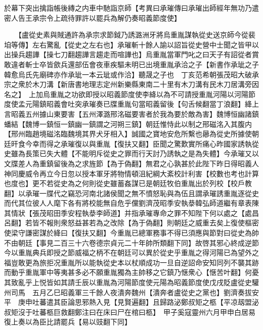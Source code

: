 於幕下突出擒詣帳後縳之内車中馳詣京師【考異曰承璀傳曰承璀出師經年無功乃遣密人告王承宗令上疏待罪許以罷兵為解仍奏昭義節度使】

　　【盧從史素與賊通許為承宗求節鉞乃誘潞洲牙將烏重胤謀執從史送京師今從裴垍等傳】左右驚亂【從史之左右也】承璀斬十餘人諭以詔旨從史營中士聞之皆甲以出操兵趨譁【操七刀翻趨譁言趨走而喧譁也】烏重胤當軍門叱之曰天子有詔從者賞敢違者斬士卒皆歛兵還部伍會夜車疾驅未明已出境重胤承洽之子【新書作承玼之子韓愈烏氏先廟碑亦作承玼一本云玼或作洽】聽晟之子也　丁亥范希朝張茂昭大破承宗之衆於木刀溝【新唐書地理志定州新樂縣東南二十里有木刀溝有民木刀居溝旁因名之】　上加烏重胤之功欲即授以昭義節度使李絳以為不可請授重胤河陽以河陽節度使孟元陽鎮昭義會吐突承璀奏已牒重胤句當昭義留後【句舌候翻當丁浪翻】絳上言昭義五州據山東要害【五州澤潞邢洺磁要害者於我為要於敵為害】魏博恒幽諸鎮蟠結【魏博一鎮恒一鎮幽一鎮謂之河朔三鎮】朝廷惟恃此以制之邢磁洺入其腹内【邢州臨趙境磁洺臨魏境其界犬牙相入】誠國之寶地安危所繫也曏為從史所據使朝廷旰食今幸而得之承璀復以與重胤【復扶又翻】臣聞之驚歎實所痛心昨國家誘執從史雖為長策已失大體【不能明斥從史之罪而行天討乃誘執之是為失體】今承璀又以文牒差人為重鎮留後為之求旌節【為于偽翻】無君之心孰甚於此陛下昨日得昭義人神同慶威令再立今日忽以授本軍牙將物情頓沮紀綱大紊校計利害【校數也考也計算也度也】更不若從史為之何則從史雖蓄姦謀已是朝廷牧伯重胤出於列校【校戶教翻】以承璀一牒代之竊恐河南北諸侯聞之無不憤怒恥與為伍且謂承璀誘重胤逐從史而代其位彼人人麾下各有將校能無自危乎儻劉濟茂昭季安執㳟韓弘師道繼有章表陳其情狀【張茂昭田季安程執㳟李師道】并指承璀專命之罪不知陛下何以處之【處昌呂翻】若皆不報則衆怒益甚若為之改除【為于偽翻】則朝廷之威重去矣上復使樞密使梁守謙密謀於絳曰【復扶又翻】今重胤已總軍務事不得已須應與節對曰從史為帥不由朝廷【事見二百三十六卷德宗貞元二十年帥所類翻下同】故啓其邪心終成逆節今以重胤典兵即授之節威福之柄不在朝廷可以異於從史乎重胤之得河陽已為望外之福豈敢更為旅拒况重胤所以能執從史本以杖順成功一旦自逆詔命安知同列不襲其跡而動乎重胤軍中等夷甚多必不願重胤獨為主帥移之它鎮乃惬衆心【惬苦叶翻】何憂其致亂乎上悦皆如其請壬辰以重胤為河陽節度使元陽為昭義節度使戊戌貶盧從史驩州司馬　五月乙巳昭義軍三千餘人夜潰奔魏州【潰奔者盧從史之黨也】劉濟奏拔安平　庚申吐蕃遣其臣論思邪熱入見【見賢遍翻】且歸路泌鄭叔矩之柩【平凉刼盟泌叔矩沒于吐蕃柩巨救翻鄭注曰在床曰尸在棺曰柩】　甲子奚寇靈州六月甲申白居易復上奏以為臣比請罷兵【易以豉翻下同】

